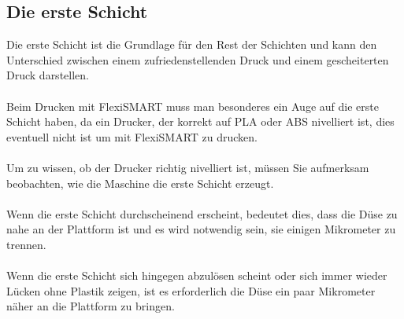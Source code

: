 \documentclass[11pt,a4paper]{article}
\begin{document}
	\subsection{Die erste Schicht}
Die erste Schicht ist die Grundlage für den Rest der Schichten und kann den Unterschied zwischen einem zufriedenstellenden Druck und einem gescheiterten Druck darstellen.
\\\\
Beim Drucken mit FlexiSMART muss man besonderes ein Auge auf die erste Schicht haben, da ein Drucker, der korrekt auf PLA oder ABS nivelliert ist, dies eventuell nicht ist um mit FlexiSMART zu drucken.
\\\\
Um zu wissen, ob der Drucker richtig nivelliert ist, müssen Sie aufmerksam beobachten, wie die Maschine die erste Schicht erzeugt.
\\\\
Wenn die erste Schicht durchscheinend erscheint, bedeutet dies, dass die Düse zu nahe an der Plattform ist und es wird notwendig sein, sie einigen Mikrometer zu trennen.
\\\\
Wenn die erste Schicht sich hingegen abzulösen scheint oder sich immer wieder Lücken ohne Plastik zeigen, ist es erforderlich die Düse ein paar Mikrometer näher an die Plattform zu bringen.
\end{document}

